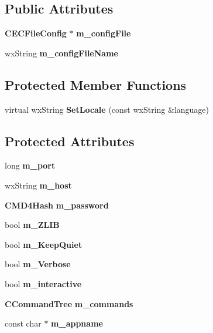 \subsection*{Public Attributes}
\begin{DoxyCompactItemize}
\item 
{\bf CECFileConfig} $\ast$ {\bfseries m\_\-configFile}\label{classCaMuleExternalConnector_a28cb647eea4ca19683e67782463f02ef}

\item 
wxString {\bfseries m\_\-configFileName}\label{classCaMuleExternalConnector_a312af9645d1001e20e77be4d5f53fdbc}

\end{DoxyCompactItemize}
\subsection*{Protected Member Functions}
\begin{DoxyCompactItemize}
\item 
virtual wxString {\bfseries SetLocale} (const wxString \&language)\label{classCaMuleExternalConnector_ad40f637dc78e32c26955730513fd4276}

\end{DoxyCompactItemize}
\subsection*{Protected Attributes}
\begin{DoxyCompactItemize}
\item 
long {\bfseries m\_\-port}\label{classCaMuleExternalConnector_a87554b48f5ad377ec654e7b8fe3b6f92}

\item 
wxString {\bfseries m\_\-host}\label{classCaMuleExternalConnector_ab23a854697001db793d9eb2593517ec3}

\item 
{\bf CMD4Hash} {\bfseries m\_\-password}\label{classCaMuleExternalConnector_a486e31fc41cf9b16c941ba11295c4ee4}

\item 
bool {\bfseries m\_\-ZLIB}\label{classCaMuleExternalConnector_a56b616cbf52d42e1881d55b6a856762a}

\item 
bool {\bfseries m\_\-KeepQuiet}\label{classCaMuleExternalConnector_a595dbfee85da1d68791ad8654e9dc3ea}

\item 
bool {\bfseries m\_\-Verbose}\label{classCaMuleExternalConnector_a76b37e87256b2e8dcd8d6b67fb13d88a}

\item 
bool {\bfseries m\_\-interactive}\label{classCaMuleExternalConnector_a5a50bc80e853c5ad66712ec4ae474e93}

\item 
{\bf CCommandTree} {\bfseries m\_\-commands}\label{classCaMuleExternalConnector_af0982d24f88995377564cabbf125a797}

\item 
const char $\ast$ {\bfseries m\_\-appname}\label{classCaMuleExternalConnector_af103566f9c80f62a5afecab57638a94a}

\end{DoxyCompactItemize}
